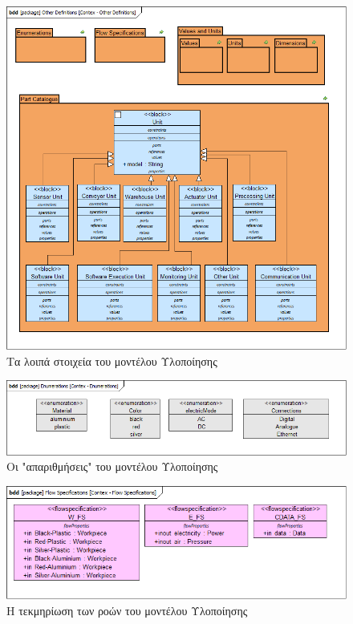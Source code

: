 \documentclass[a4paper,12pt,twoside]{report}
\begin{document}
{\begin{appendices}
				\begin{figure}[hp]
					\centering
					\includegraphics[scale=0.50]{DesignModel_Contex-OtherDefinitions.png}
					\caption{Τα λοιπά στοιχεία του μοντέλου Υλοποίησης}
					\label{φωτ:Τα λοιπά στοιχεία του μοντέλου Υλοποίησης}
				\end{figure}
				
				\begin{figure}[hp]
					\centering
					\includegraphics[scale=0.50]{DesignModel_Contex-Enumerations.png}
					\caption{Οι "απαριθμήσεις" του μοντέλου Υλοποίησης}
					\label{φωτ:Οι "απαριθμήσεις" του μοντέλου Υλοποίησης}
				\end{figure}
				
				\begin{figure}[hp]
					\centering
					\includegraphics[scale=0.50]{DesignModel_Contex-FlowSpecifications.png}
					\caption{Η τεκμηρίωση των ροών του μοντέλου Υλοποίησης}
					\label{φωτ:Η τεκμηρίωση των ροών του μοντέλου Υλοποίησης}
				\end{figure}
				

\end{appendices}}
\end{document}
